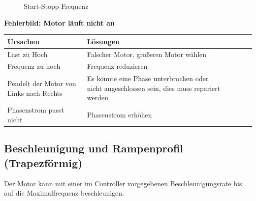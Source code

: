 {{{\begin{figure}[!ht]
	\caption{Start-Stopp Frequenz \cite{Faulhaber:2020}} \label{Start-Stopp Frequenz}
\end{figure}

{\textbf{Fehlerbild: Motor läuft nicht an} 
	\begin{center}
		\fontsize{8}{10}\selectfont
		\begin{tabularx}{\textwidth}{|X|X|X|X|X|X|}
			\hline 
			\textbf{Ursachen} & \textbf{Lösungen} \\ \hline
			Last zu Hoch & Falscher Motor, größeren Motor wählen \\ \hline
			Frequenz zu hoch & Frequenz reduzieren\\ \hline
			Pendelt der Motor von Links nach Rechts & Es könnte eine Phase unterbrochen oder nicht angeschlossen sein, dies muss repariert werden \\ \hline
			Phasenstrom passt nicht & Phasenstrom erhöhen\\ \hline
			
		\end{tabularx}
		 \label{MOTLNA} 
	\end{center}
	
	
	\subsection{Beschleunigung und Rampenprofil (Trapezförmig)}
	
	Der Motor kann mit einer im Controller vorgegebenen Beschleunigungsrate bis auf die Maximalfrequenz beschleunigen.\cite{Faulhaber:2020} 
	
}}}}
